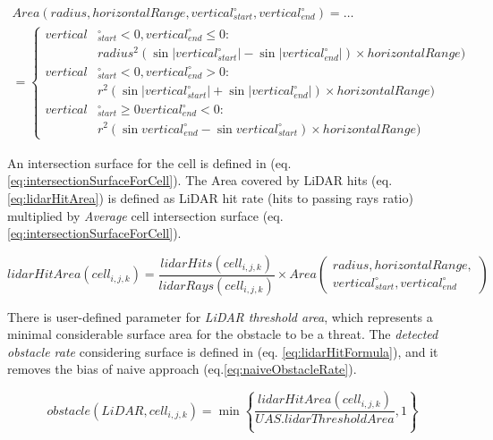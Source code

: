 \begin{multline}\label{eq:intersectionSurfaceForCell}
    Area(radius,horizontal Range, vertical_{start}^\circ, vertical_{end}^\circ) =\dots\\ 
    =\left\{
    \begin{aligned}
        vertical&_{start}^\circ <0, vertical_{end}^\circ \le 0 :\\ 
            &radius^2(\sin |vertical_{start}^\circ| - \sin|vertical_{end}^\circ|)\times horizontal Range)\\
         vertical&_{start}^\circ <0, vertical_{end}^\circ > 0   :\\
            & r^2(\sin |vertical_{start}^\circ| + \sin|vertical_{end}^\circ|)\times horizontal Range)\\
         vertical&_{start}^\circ \ge 0 vertical_{end}^\circ < 0 :\\
            & r^2(\sin vertical_{end}^\circ- \sin vertical_{start}^\circ)\times horizontal Range)
    \end{aligned}
    \right.
\end{multline}

\noindent An intersection surface for the cell is defined in (eq. \ref{eq:intersectionSurfaceForCell}). The Area covered by LiDAR hits (eq. \ref{eq:lidarHitArea}) is defined as LiDAR hit rate (hits to passing rays ratio) multiplied by \emph{Average} cell intersection surface (eq. \ref{eq:intersectionSurfaceForCell}).

\begin{equation}\label{eq:lidarHitArea}
    lidar Hit Area(cell_{i,j,k}) = \frac{lidar Hits(cell_{i,j,k})}{lidar Rays(cell_{i,j,k})} \times Area\left(\begin{gathered}radius,horizontal Range,\\ vertical_{start}^\circ, vertical_{end}^\circ\end{gathered}\right)
\end{equation}

\noindent There is user-defined parameter for \emph{LiDAR threshold area}, which represents a minimal considerable surface area for the obstacle to be a threat. The \emph{detected obstacle rate} considering surface is defined in (eq. \ref{eq:lidarHitFormula}), and it removes the bias of naive approach (eq.\ref{eq:naiveObstacleRate}).

\begin{equation}\label{eq:lidarHitFormula}
    obstacle(LiDAR,cell_{i,j,k})=\min\left\{\frac{lidar Hit Area(cell_{i,j,k})}{UAS.lidar Threshold Area},1\right\}
\end{equation}

